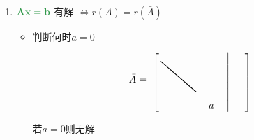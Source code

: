 \documentclass[./linear_algebra.tex]{subfiles}
\begin{document}
    \begin{enumerate}
        \item $\mathbf{\color[rgb]{0.2, 0.6, 0.3}{Ax = b}}$ 有解 $\Leftrightarrow r(A) = r(\bar{A})$
        \begin{itemize}
            \item 判断何时$a = 0$
            \[
                \bar{A} =
                \begin{tikzpicture}[baseline=(current bounding box.center)]
                    \node (mat) {
                        $\begin{bmatrix}
                             \; & \; & \; & \; & \; & \;\big|\; & \; \\
                             \; & \; & \; & \; & \; & \;\big|\; & \; \\
                             \; & \; & \; & \; & \; & \;\big|\; & \; \\
                             \; & \; & \; & \; & \; & \;\big|\; & \; \\
                             \; & \; & \; & \; & a  & \;\big|\; &
                        \end{bmatrix}$
                    };

                    \draw[thick,black]
                    ([xshift=12pt,yshift=-12pt]mat.north west) --
                    ([xshift=-60pt,yshift=24pt]mat.south east);
                \end{tikzpicture}
            \]
            若$a = 0$则{\color{red}{有可能}}无解
\end{itemize}
\end{enumerate}
\end{document}
